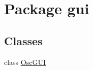 \hypertarget{namespacegui}{}\section{Package gui}
\label{namespacegui}
\subsection*{Classes}
\begin{DoxyCompactItemize}
\item 
class \hyperlink{classgui_1_1_osc_g_u_i}{Osc\+G\+UI}
\end{DoxyCompactItemize}

